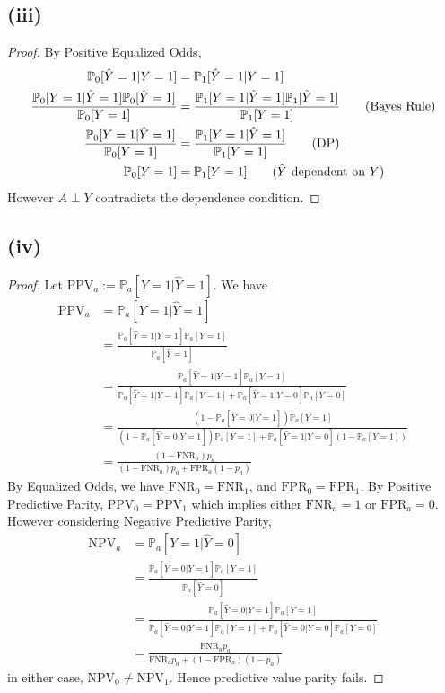 \documentclass[twoside,11pt]{homework}
\begin{document}
 \subsection*{(iii)}
 	\begin{proof}
 		By Positive Equalized Odds,
 		\begin{align*}
 			\mathbb{P}_0[ \hat{Y}=1|Y=1] &= \mathbb{P}_1[\hat{Y}=1|Y=1] \\
 			\frac{\mathbb{P}_0[Y=1|\hat{Y}=1] \mathbb{P}_0[\hat{Y}=1] }{\mathbb{P}_0[{Y}=1] }
 			&= \frac{\mathbb{P}_1[Y=1|\hat{Y}=1] \mathbb{P}_1[\hat{Y}=1] }{ \mathbb{P}_1[{Y}=1] } \tag{Bayes Rule} \\
 			\frac{\mathbb{P}_0[Y=1|\hat{Y}=1]}{\mathbb{P}_0[{Y}=1] }
 			&= \frac{\mathbb{P}_1[Y=1|\hat{Y}=1]}{ \mathbb{P}_1[{Y}=1] } \tag{DP}\\
 			\mathbb{P}_0[Y=1] &= \mathbb{P}_1[Y=1] \tag{$\hat{Y}$ dependent on $Y$}
 		\end{align*}
 		However $A\perp Y$ contradicts the dependence condition.
 	\end{proof}
 \subsection*{(iv)}
 	\begin{proof}
 		Let $\text{PPV}_a := \mathbb{P}_a[Y=1 | \hat{Y}=1]$. We have
 		\begin{align*}
 			\text{PPV}_a & = \mathbb{P}_a[Y=1 | \hat{Y}=1] \\
 			&= \frac{\mathbb{P}_a[\hat{Y}=1|Y=1] \mathbb{P}_a[Y=1] }
 			{\mathbb{P}_a[\hat{Y}=1] } \tag{Bayes Rule}\\
 			&= \frac{\mathbb{P}_a[\hat{Y}=1|Y=1] \mathbb{P}_a[Y=1] }
 			{\mathbb{P}_a[\hat{Y}=1|Y=1] \mathbb{P}_a[Y=1]+
 			\mathbb{P}_a[\hat{Y}=1|Y=0] \mathbb{P}_a[Y=0] }\\
 			&= \frac{ (1-\mathbb{P}_a[\hat{Y}=0|Y=1]) \mathbb{P}_a[Y=1] }
 			{ (1-\mathbb{P}_a[\hat{Y}=0|Y=1])  \mathbb{P}_a[Y=1]+
 			\mathbb{P}_a[\hat{Y}=1|Y=0] (1-\mathbb{P}_a[Y=1]) }\\
 			&= \frac{(1-\text{FNR}_a) p_a}{(1-\text{FNR}_a)  p_a+\text{FPR}_a(1-p_a)}
 		\end{align*}
 		By Equalized Odds, we have $\text{FNR}_0=\text{FNR}_1$, and $\text{FPR}_0=\text{FPR}_1$.
 		By Positive Predictive Parity, $\text{PPV}_0=\text{PPV}_1$ which implies either $\text{FNR}_a=1$
 		or $\text{FPR}_a=0$. However considering Negative Predictive Parity,
 		\begin{align*}
 			\text{NPV}_a &=  \mathbb{P}_a[Y=1 | \hat{Y}=0] \\
 			&= \frac{\mathbb{P}_a[\hat{Y}=0|Y=1] \mathbb{P}_a[Y=1] }
 			{\mathbb{P}_a[\hat{Y}=0] } \tag{Bayes Rule}\\
 			&= \frac{\mathbb{P}_a[\hat{Y}=0|Y=1] \mathbb{P}_a[Y=1] }
 			{\mathbb{P}_a[\hat{Y}=0|Y=1] \mathbb{P}_a[Y=1]+
 			\mathbb{P}_a[\hat{Y}=0|Y=0] \mathbb{P}_a[Y=0] }\\
 			&= \frac{\text{FNR}_a p_a}{\text{FNR}_a p_a+(1-\text{FPR}_a)(1-p_a)}
 		\end{align*}
 		in either case, $\text{NPV}_0\neq \text{NPV}_1$. Hence predictive value parity fails.
 	\end{proof}
\end{document}
